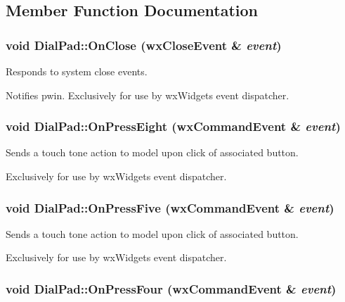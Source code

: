 \subsection{Member Function Documentation}
\hypertarget{classDialPad_d3bc3a3c043049ef4d396768dfade82f}{
\subsubsection[{OnClose}]{\setlength{\rightskip}{0pt plus 5cm}void DialPad::OnClose (wxCloseEvent \& {\em event})}}
\label{classDialPad_d3bc3a3c043049ef4d396768dfade82f}


Responds to system close events. 

Notifies pwin. Exclusively for use by wxWidgets event dispatcher. \hypertarget{classDialPad_a12bc9af8ce8a3fdad15fa55f70ea5c0}{
\subsubsection[{OnPressEight}]{\setlength{\rightskip}{0pt plus 5cm}void DialPad::OnPressEight (wxCommandEvent \& {\em event})}}
\label{classDialPad_a12bc9af8ce8a3fdad15fa55f70ea5c0}


Sends a touch tone action to model upon click of associated button. 

Exclusively for use by wxWidgets event dispatcher. \hypertarget{classDialPad_1117cbca8f1075f55097b8a2c3859d7f}{
\subsubsection[{OnPressFive}]{\setlength{\rightskip}{0pt plus 5cm}void DialPad::OnPressFive (wxCommandEvent \& {\em event})}}
\label{classDialPad_1117cbca8f1075f55097b8a2c3859d7f}


Sends a touch tone action to model upon click of associated button. 

Exclusively for use by wxWidgets event dispatcher. \hypertarget{classDialPad_3ba175a7000657d2a79ccbb858b5803f}{
\subsubsection[{OnPressFour}]{\setlength{\rightskip}{0pt plus 5cm}void DialPad::OnPressFour (wxCommandEvent \& {\em event})}}
\label{classDialPad_3ba175a7000657d2a79ccbb858b5803f}


